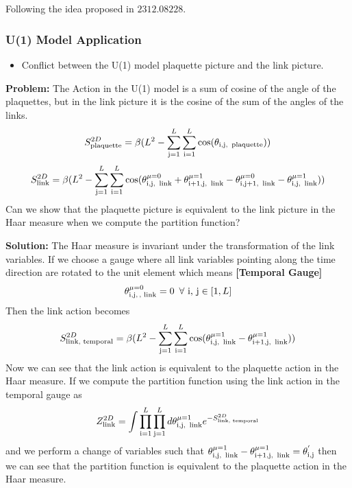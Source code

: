 \begin{center}
\section*{\creationmonth}
\end{center}


Following the idea proposed in $2312.08228$. 
\subsubsection*{U(1) Model Application}
\begin{itemize}
    \item Conflict between the U(1) model plaquette picture and the link picture.
\end{itemize}

\textbf{Problem:} 
The Action in the U(1) model is a sum of cosine of the angle of the plaquettes, but in the link picture  it is the cosine of the sum of the angles of the links.
\begin{equation}
    S_{\text{plaquette}}^{2D} = \beta(L^2- \sum_{\text{j}=1}^{L}\sum_{\text{i}=1}^{L} \cos(\theta_{\text{i,j, \,plaquette}}))
\end{equation}
\begin{equation}
    S_{\text{link}}^{2D} = \beta(L^2- \sum_{\text{j}=1}^{L}\sum_{\text{i}=1}^{L}\cos(\theta_{\text{i,j, \,link}}^{\mu=0}+\theta_{\text{i+1,j, \,link}}^{\mu=1}-\theta_{\text{i,j+1, \,link}}^{\mu=0}-\theta_{\text{i,j, \,link}}^{\mu=1}))
\end{equation}
Can we show that the plaquette picture is equivalent to the link picture in the Haar measure when we compute the partition function?

\textbf{Solution:}
The Haar measure is invariant under the transformation of the link variables. If we choose a gauge where all link variables pointing along the time direction are rotated to the unit element which means \textbf{[Temporal Gauge]} $$\theta^{\mu=0}_{\text{i,j,\,, link}} = 0 \,\,\,\forall\,\,\text{i, j}\in[1, L]$$
Then the link action becomes
\begin{equation}
    S_{\text{link, temporal}}^{2D} = \beta(L^2- \sum_{\text{j}=1}^{L}\sum_{\text{i}=1}^{L}\cos(\theta_{\text{i,j, \,link}}^{\mu=1}-\theta_{\text{i+1,j, \,link}}^{\mu=1}))
\end{equation}
Now we can see that the link action is equivalent to the plaquette action in the Haar measure. If we compute the partition function using the link action in the temporal gauge as
\begin{equation}
    Z^{2D}_{\text{link}} = \int \prod_{\text{i}=1}^{L}\prod_{\text{j}=1}^{L}d\theta_{\text{i,j, \,link}}^{\mu=1}e^{-S_{\text{link, temporal}}^{2D}}
\end{equation}
and we perform a change of variables such that $\theta_{\text{i,j, \,link}}^{\mu=1}  - \theta_{\text{i+1,j, \,link}}^{\mu=1}= \theta^{'}_{\text{i,j}}$ then we can see that the partition function is equivalent to the plaquette action in the Haar measure.

